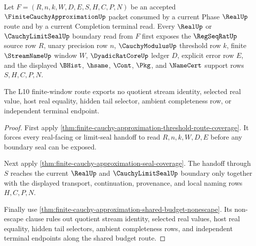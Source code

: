 \begin{theorem}
\label{thm:finite-cauchy-approximation-l10-window-exhaustion}
Let $F=(R,n,k,W,D,E,S,H,C,P,N)$ be an accepted $\FiniteCauchyApproximationUp$ packet consumed by a current Phase $\RealUp$ route and by a current Completion terminal read. Every $\RealUp$ or $\CauchyLimitSealUp$ boundary read from $F$ first exposes the $\RegSeqRatUp$ source row $R$, unary precision row $n$, $\CauchyModulusUp$ threshold row $k$, finite $\StreamNameUp$ window $W$, $\DyadicRatCoreUp$ ledger $D$, explicit error row $E$, and the displayed $\BHist$, $\hsame$, $\Cont$, $\Pkg$, and $\NameCert$ support rows $S,H,C,P,N$.

The L10 finite-window route exports no quotient stream identity, selected real value, host real equality, hidden tail selector, ambient completeness row, or independent terminal endpoint.
\end{theorem}
\begin{proof}
First apply \autoref{thm:finite-cauchy-approximation-threshold-route-coverage}. It forces every real-facing or limit-seal handoff to read $R,n,k,W,D,E$ before any boundary seal can be exposed.

Next apply \autoref{thm:finite-cauchy-approximation-seal-coverage}. The handoff through $S$ reaches the current $\RealUp$ and $\CauchyLimitSealUp$ boundary only together with the displayed transport, continuation, provenance, and local naming rows $H,C,P,N$.

Finally use \autoref{thm:finite-cauchy-approximation-shared-budget-nonescape}. Its non-escape clause rules out quotient stream identity, selected real values, host real equality, hidden tail selectors, ambient completeness rows, and independent terminal endpoints along the shared budget route.
\end{proof}


